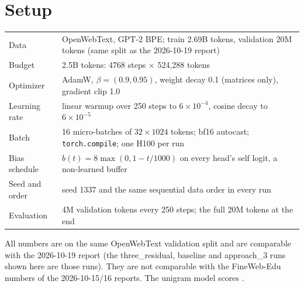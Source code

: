 \documentclass[11pt]{article}
\newcommand{\code}[1]{\texttt{#1}}
\newcommand{\tr}{three\_residual}
\begin{document}
\section{Setup}

\begin{center}\small
\begin{tabularx}{\linewidth}{lX}
\toprule
Data & OpenWebText, GPT-2 BPE; train 2.69B tokens, validation 20M tokens (same split as the 2026-10-19 report) \\
Budget & 2.5B tokens: 4768 steps $\times$ 524{,}288 tokens \\
Optimizer & AdamW, $\beta=(0.9, 0.95)$, weight decay 0.1 (matrices only), gradient clip 1.0 \\
Learning rate & linear warmup over 250 steps to $6\times10^{-4}$, cosine decay to $6\times10^{-5}$ \\
Batch & 16 micro-batches of $32\times1024$ tokens; bf16 autocast; \code{torch.compile}; one H100 per run \\
Bias schedule & $b(t) = 8\max(0, 1 - t/1000)$ on every head's self logit, a non-learned buffer \\
Seed and order & seed 1337 and the same sequential data order in every run \\
Evaluation & 4M validation tokens every 250 steps; the full 20M tokens at the end \\
\bottomrule
\end{tabularx}
\end{center}

All numbers are on the same OpenWebText validation split and are comparable with the 2026-10-19 report (the
\tr{}, baseline and approach\_3 runs shown here are those runs). They are not comparable with the FineWeb-Edu
numbers of the 2026-10-15/16 reports. The unigram model scores \Unigram{}.
\end{document}
